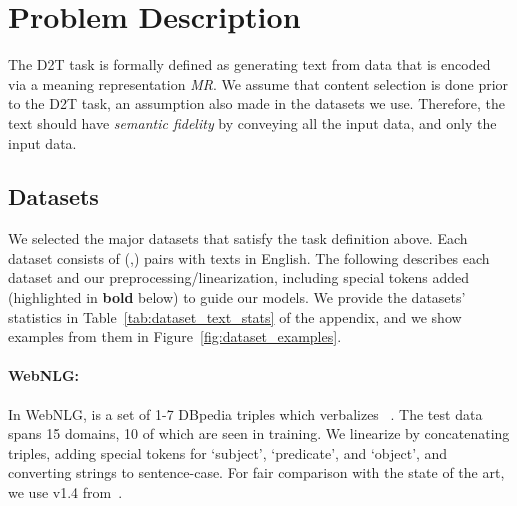 \documentclass[11pt]{article}
\newcommand{\webnlg}{WebNLG\xspace}
\newcommand{\mr}{\textit{MR}\xspace}
\theoremstyle{definition}
\theoremstyle{break}
\begin{document}
\section{Problem Description}

The D2T task is formally defined as generating text  from data  that is encoded via a meaning representation \mr. We assume that content selection is done prior to the D2T task, an assumption also made in the datasets we use. Therefore, the text  should have \textit{semantic fidelity} by conveying all the input data, and only the input data. 

\subsection{Datasets}

We selected the major datasets that satisfy the task definition above. Each dataset consists of (,) pairs with texts in English. The following describes each dataset and our preprocessing/linearization, 
including special tokens added  (highlighted in \textbf{bold} below) 
to guide our models. We provide the datasets' statistics in Table~\ref{tab:dataset_text_stats} of the appendix, and we show examples from them in Figure~\ref{fig:dataset_examples}.

\paragraph{\webnlg:} In \webnlg,  is a set of 1-7 DBpedia triples which  verbalizes ~\cite{gardent2017creating}. The test data spans 15 domains, 10 of which are seen in training. We linearize by concatenating triples, adding special tokens for `subject', `predicate', and `object', and converting strings to sentence-case. For fair comparison with the state of the art, we use v1.4 from~.
\end{document}
